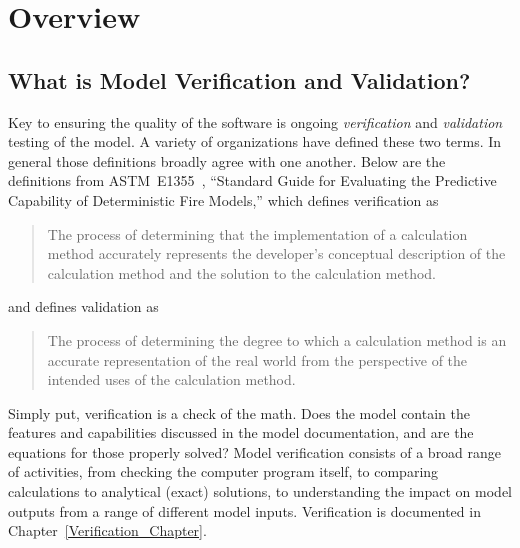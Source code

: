 
\chapter{Overview}



\section{What is Model Verification and Validation?}

Key to ensuring the quality of the software is ongoing {\em verification} and {\em validation} testing of the model. A variety of organizations have defined these two terms. In general those definitions broadly agree with one another. Below are the definitions from ASTM~E1355~\cite{CFAST:ASTM:E1355}, ``Standard Guide for Evaluating the Predictive Capability of Deterministic Fire Models,'' which defines verification as
\begin{quote}
    The process of determining that the implementation of a calculation method accurately represents the developer's conceptual description of the calculation method and the solution to the calculation method.
\end{quote}
and defines validation as
\begin{quote}
    The process of determining the degree to which a calculation method is an accurate representation of the real world from the perspective of the intended uses of the calculation method.
\end{quote}
Simply put, verification is a check of the math. Does the model contain the features and capabilities discussed in the model documentation, and are the equations for those properly solved? Model verification consists of a broad range of activities, from checking the computer program itself, to comparing calculations to analytical (exact) solutions, to understanding the impact on model outputs from a range of different model inputs. Verification is documented in Chapter~\ref{Verification_Chapter}.

